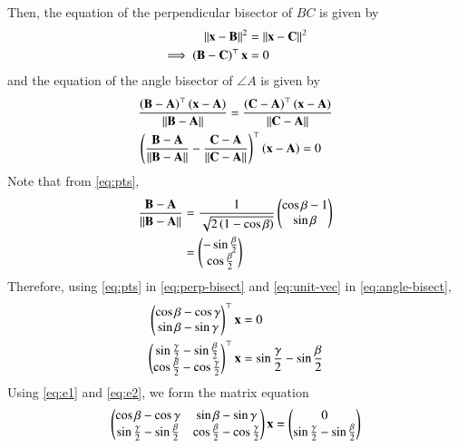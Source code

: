 \documentclass[journal,12pt,twocolumn]{IEEEtran}
\renewcommand{\vec}[1]{\boldsymbol{\mathbf{#1}}}
\begin{document}
\begin{enumerate}
    Then, the equation of the perpendicular bisector of $BC$ is given by
    \begin{align}
        \norm{\vec{x}-\vec{B}}^2&=\norm{\vec{x}-\vec{C}}^2 \\
        \implies \brak{\vec{B}-\vec{C}}^\top\vec{x} &= 0
        \label{eq:perp-bisect}
    \end{align}
    and the equation of the angle bisector of $\angle A$ is given by
    \begin{align}
        &\frac{\brak{\vec{B}-\vec{A}}^\top\brak{\vec{x}-\vec{A}}}{\norm{\vec{B}-\vec{A}}} = \frac{\brak{\vec{C}-\vec{A}}^\top\brak{\vec{x}-\vec{A}}}{\norm{\vec{C}-\vec{A}}} \\
        &\brak{\frac{\vec{B}-\vec{A}}{\norm{\vec{B}-\vec{A}}}-\frac{\vec{C}-\vec{A}}{\norm{\vec{C}-\vec{A}}}}^\top\brak{\vec{x}-\vec{A}} = 0
        \label{eq:angle-bisect}
    \end{align}
    Note that from \eqref{eq:pts},
    \begin{align}
        \frac{\vec{B}-\vec{A}}{\norm{\vec{B}-\vec{A}}} &= \frac{1}{\sqrt{2\brak{1-\cos\beta}}}\myvec{\cos\beta-1\\\sin\beta} \\
                                                       &= \myvec{-\sin\frac{\beta}{2}\\\cos\frac{\beta}{2}}
                                                       \label{eq:unit-vec}
    \end{align}
    Therefore, using \eqref{eq:pts} in \eqref{eq:perp-bisect} and
    \eqref{eq:unit-vec} in \eqref{eq:angle-bisect},
    \begin{align}
        \myvec{\cos\beta-\cos\gamma\\\sin\beta-\sin\gamma}^\top\vec{x} &= 0 \label{eq:e1} \\
        \myvec{\sin\frac{\gamma}{2}-\sin\frac{\beta}{2}\\\cos\frac{\beta}{2}-\cos\frac{\gamma}{2}}^\top\vec{x} &= \sin\frac{\gamma}{2}-\sin\frac{\beta}{2} \label{eq:e2}
    \end{align}
    Using \eqref{eq:e1} and \eqref{eq:e2}, we form the matrix equation
    \begin{align}
        \myvec{\cos\beta-\cos\gamma&\sin\beta-\sin\gamma\\\sin\frac{\gamma}{2}-\sin\frac{\beta}{2}&\cos\frac{\beta}{2}-\cos\frac{\gamma}{2}}\vec{x} = \myvec{0\\\sin\frac{\gamma}{2}-\sin\frac{\beta}{2}}
        \label{eq:mtx-eqn}
    \end{align}

\end{enumerate}
\end{document}
